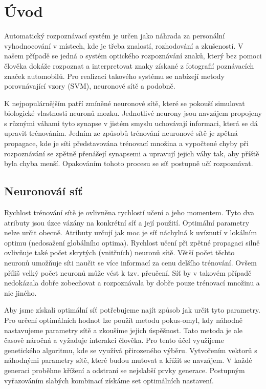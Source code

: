 \documentclass[12pt]{article}
\begin{document}
\section{Úvod}
Automatický rozpoznávací systém je určen jako náhrada za personální vyhodnocování v místech, kde je třeba znalostí, rozhodování a zkušeností. V našem případě se jedná o systém optického rozpoznávání znaků, který bez pomoci člověka dokáže rozpoznat a interpretovat znaky získané z fotografií poznávacích značek automobilů. Pro realizaci takového systému se nabízejí metody porovnávající vzory (SVM), neuronové sítě a podobně.

K nejpopulárnějším patří zmíněné neuronové sítě, které se pokouší simulovat biologické vlastnosti neuronů mozku. Jednotlivé neurony jsou navzájem propojeny s různými váhami tyto synapse v jistém smyslu uchovávají informaci, která se dá upravit trénováním. Jedním ze způsobů trénování neuronové sítě je zpětná propagace, kde je síti představována trénovací množina a vypočtené chyby při rozpoznávání se zpětně přenášejí synapsemi a upravují jejich váhy tak, aby příště byla chyba menší. Opakováním tohoto procesu se síť postupně učí rozpoznávat.

\pagebreak
\subsection{Neuronováí síť}
Rychlost trénování sítě je ovlivněna rychlostí učení a jeho momentem. Tyto dva atributy jsou úzce vázány na konkrétní síť a její použití. Optimální parametry nelze určit obecně. Atributy určují jak moc je síť náchylná k uvíznutí v lokálním optimu (nedosažení globálního optima). Rychlost učení při zpětné propagaci silně ovlivňuje také počet skrytých (vnitřních) neuronů sítě. Větší počet těchto neuronů umožňuje síti naučit se více informací za cenu delšího trénování. Ovšem příliš velký počet neuronů může vést k tzv. přeučení. Síť by v takovém případě nedokázala dobře zobecňovat a rozpoznávala by dobře pouze trénovací množinu a nic jiného.

Aby jsme získali optimální síť potřebujeme najít způsob jak určit tyto parametry. Pro určení optimálních hodnot lze použít metodu pokus-omyl, kdy náhodně nastavujeme parametry sítě a zkoušíme jejich úspěšnost. Tato metoda je ale časově náročná a vyžaduje interakci člověka.  Pro tento účel využijeme genetického algoritmu, kde se využívá přirozeného výběru. Vytvořením vektorů s náhodnými parametry sítě, které budou mutovat a křížit se navzájem. V každé generaci proběhne křížení a odstraní se nejslabší prvky generace. Postupným vyřazováním slabých kombinací získáme set optimálních nastavení.
\end{document}
